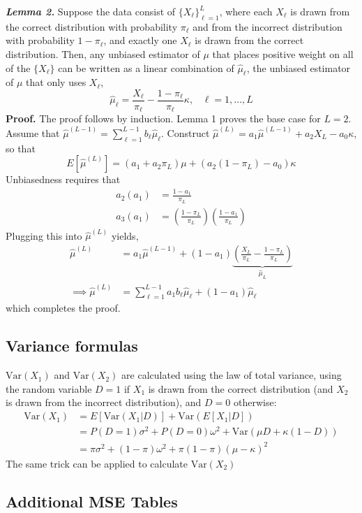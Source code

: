 \documentclass[12pt]{article}
\newcommand{\Var}[1]{\text{Var}\left(#1\right)}
\begin{document}
\noindent \textit{\textbf{Lemma 2.}} Suppose the data consist of $\{X_{\ell}\}_{\ell=1}^{L}$, where each $X_{\ell}$ is drawn from the correct distribution with probability $\pi_{\ell}$ and from the incorrect distribution with probability $1-\pi_{\ell}$, and exactly one $X_{\ell}$ is drawn from the correct distribution.  Then, any unbiased estimator of $\mu$ that places positive weight on all of the $\{X_{\ell}\}$ can be written as a linear combination of $\hat{\mu}_{\ell}$, the unbiased estimator of $\mu$ that only uses $X_{\ell}$, 
$$ \hat{\mu}_{\ell} = \frac{X_{\ell}}{\pi_{\ell}}  - \frac{1-\pi_{\ell}}{\pi_{\ell}} \kappa, \hspace{10pt} \ell = 1, \dots, L $$
\textbf{Proof.}  The proof follows by induction.  Lemma 1 proves the base case for $L=2$.  Assume that $\hat{\mu}^{(L-1)} = \sum_{\ell=1}^{L-1} b_{\ell} \hat{\mu}_{\ell}$.  Construct $\hat{\mu}^{(L)} = a_1 \hat{\mu}^{(L-1)} + a_2 X_L - a_0 \kappa$, so that
$$ E[\hat{\mu}^{(L)}] = (a_1 + a_2 \pi_L) \mu + (a_2(1-\pi_L) - a_0) \kappa $$
Unbiasedness requires that
\begin{align*}
a_2(a_1) &=  \frac{1-a_1}{\pi_L} \\ 
a_3(a_1) &= \left(\frac{1-\pi_L}{\pi_L}\right)\left(\frac{1-a_1}{\pi_L}\right)
\end{align*}
Plugging this into $\hat{\mu}^{(L)}$ yields,
\begin{align*} \hat{\mu}^{(L)} &= a_1 \hat{\mu}^{(L-1)} + (1-a_1)\underbrace{\left(\frac{X_L}{\pi_L} - \frac{1-\pi_L}{\pi_L}\right)}_{\hat{\mu}_L} \\
\implies \hat{\mu}^{(L)} &= \sum_{\ell=1}^{L-1} a_1 {b_\ell} \hat{\mu}_{\ell} + (1 - a_1) \hat{\mu}_{\ell}
\end{align*}
which completes the proof.  

\subsection{Variance formulas}
$\Var{X_1}$ and $\Var{X_2}$ are calculated using the law of total variance, using the random variable $D = 1$ if $X_1$ is drawn from the correct distribution (and $X_2$ is drawn from the incorrect distribution), and $D=0$ otherwise:
\begin{align*} \Var{X_1} &= E[\Var{X_1 | D}] + \Var{E[X_1| D]} \\ 
&= P(D=1)\sigma^2 +  P(D=0)\omega^2 + \Var{\mu D + \kappa (1-D)} \\
&= \pi \sigma^2 + (1-\pi) \omega^2 + \pi(1-\pi)(\mu-\kappa)^2
\end{align*}
The same trick can be applied to calculate $\Var{X_2}$

\subsection{Additional MSE Tables}






\end{document}
